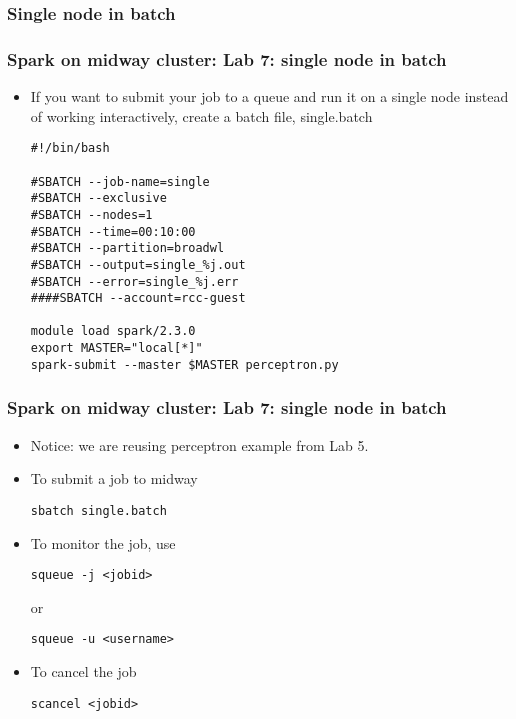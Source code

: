 \subsubsection{Single node in batch}
\begin{frame}[fragile]
  \frametitle{Spark on midway cluster: Lab 7: single node in batch}
  \begin{itemize}
  \item If you want to submit your job to a queue and run it on a single node instead of working interactively, create a batch file, {\color{mycolorcli}single.batch}
    {\color{mycolorcli}
\begin{verbatim}
#!/bin/bash

#SBATCH --job-name=single
#SBATCH --exclusive
#SBATCH --nodes=1
#SBATCH --time=00:10:00
#SBATCH --partition=broadwl
#SBATCH --output=single_%j.out
#SBATCH --error=single_%j.err
####SBATCH --account=rcc-guest

module load spark/2.3.0
export MASTER="local[*]"
spark-submit --master $MASTER perceptron.py
\end{verbatim}
    }
  \end{itemize}
\end{frame}

\begin{frame}[fragile]
  \frametitle{Spark on midway cluster: Lab 7: single node in batch}
  \begin{itemize}
  \item Notice: we are reusing perceptron example from Lab 5.
  \item To submit a job to midway
    {\color{mycolorcli}
\begin{verbatim}
sbatch single.batch
\end{verbatim}
    }
  \item To monitor the job, use
    {\color{mycolorcli}
\begin{verbatim}
squeue -j <jobid>
\end{verbatim}
    }
    or
    {\color{mycolorcli}
\begin{verbatim}
squeue -u <username>
\end{verbatim}
    }
  \item To cancel the job
    {\color{mycolorcli}
\begin{verbatim}
scancel <jobid>
\end{verbatim}
    }
  \end{itemize}
\end{frame}



